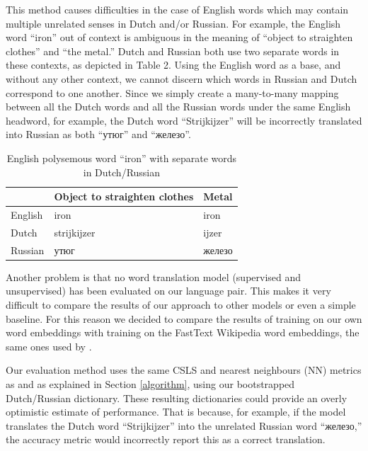 \documentclass{article}
\begin{document}
This method causes difficulties in the case of English words which may contain multiple unrelated senses in Dutch and/or Russian. For example, the English word ``iron'' out of context is ambiguous in the meaning of ``object to straighten clothes'' and ``the metal.'' Dutch and Russian both use two separate words in these contexts, as depicted in Table 2. Using the English word as a base, and without any other context, we cannot discern which words in Russian and Dutch correspond to one another. Since we simply create a many-to-many mapping between all the Dutch words and all the Russian words under the same English headword, for example, the Dutch word ``Strijkijzer'' will be incorrectly translated into Russian as both ``утюг'' and ``железо''. 

\begin{table}[ht]
\centering
\label{table:iron}
\begin{tabular}{|l|l|l|}
\hline
        & Object to straighten clothes & Metal                  \\ \hline
English & iron                         & iron                       \\ \hline
Dutch   & strijkijzer                  & ijzer                      \\ \hline
Russian & утюг    					   & железо \\ \hline
\end{tabular}
\caption{English polysemous word ``iron'' with separate words in Dutch/Russian}
\end{table}

Another problem is that no word translation model (supervised and unsupervised) has been evaluated on our language pair. This makes it very difficult to compare the results of our approach to other models or even a simple baseline. For this reason we decided to compare the results of training on our own word embeddings with training on the FastText \citep{bojanowski2016enriching}Wikipedia word embeddings, the same ones used by \citet{conneau2017word}.

Our evaluation method uses the same CSLS and nearest neighbours (NN) metrics as \citet{conneau2017word} and as explained in Section \ref{algorithm}, using our bootstrapped Dutch/Russian dictionary. These resulting dictionaries could provide an overly optimistic estimate of performance. That is because, for example, if the model translates the Dutch word ``Strijkijzer'' into the unrelated Russian word ``железо,'' the accuracy metric would incorrectly report this as a correct translation.
\end{document}
